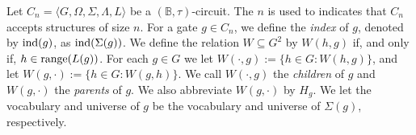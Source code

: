 \documentclass[../paper.tex]{subfiles}
\begin{document}
Let $C_n = \langle G, \Omega, \Sigma, \Lambda, L \rangle$ be a $(\mathbb{B},
\tau)$-circuit. The $n$ is used to indicates that $C_n$ accepts structures of
size $n$. For a gate $g \in C_n$, we define the \emph{index} of $g$, denoted by
$\text{\upshape ind}(g)$, as $\text{\upshape ind}(\Sigma(g))$. We define the relation $W \subseteq G^2$ by
$W(h,g)$ if, and only if, $h \in \text{range}(L(g))$. For each $g \in G$ we let
$W(\cdot, g) := \{h \in G : W(h,g)\}$, and let $W(g, \cdot) := \{h \in G :
W(g,h)\}$. We call $W(\cdot, g)$ the \emph{children} of $g$ and $W(g, \cdot)$
the \emph{parents} of $g$. We also abbreviate $W(g, \cdot)$ by $H_g$. We let the
vocabulary and universe of $g$ be the vocabulary and universe of $\Sigma(g)$,
respectively.






\end{document}
